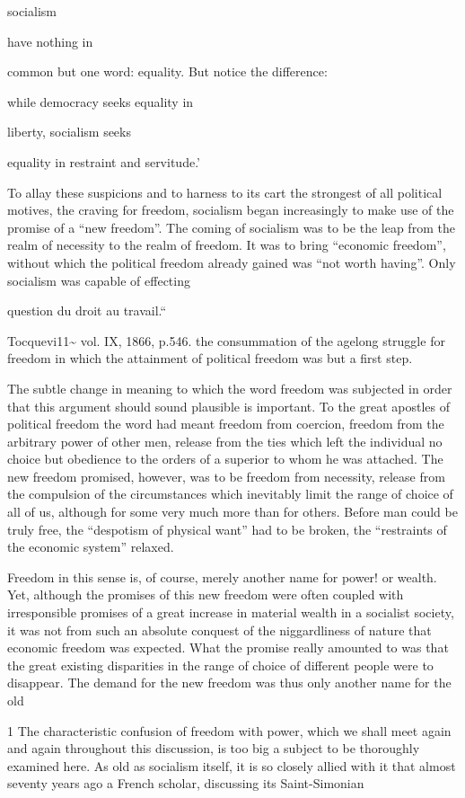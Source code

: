 \documentclass[11pt,openany]{book}
\begin{document}
socialism

have nothing in

common but one word: equality. But notice the difference:

while democracy seeks equality in

liberty, socialism seeks

equality in restraint and servitude.'

To allay these suspicions and to harness to its cart the strongest of all political motives, the craving for freedom, socialism began increasingly to make use of the promise of a ``new freedom''. The coming of socialism was to be the leap from the realm of necessity to the realm of freedom. It was to bring ``economic freedom'', without which the political freedom already gained was ``not worth having''. Only socialism was capable of effecting

question du droit au travail.``

Tocquevi11\textasciitilde{} vol. IX, 1866, p.546. the consummation of the agelong struggle for freedom in which the attainment of political freedom was but a first step.

The subtle change in meaning to which the word freedom was subjected in order that this argument should sound plausible is important. To the great apostles of political freedom the word had meant freedom from coercion, freedom from the arbitrary power of other men, release from the ties which left the individual no choice but obedience to the orders of a superior to whom he was attached. The new freedom promised, however, was to be freedom from necessity, release from the compulsion of the circumstances which inevitably limit the range of choice of all of us, although for some very much more than for others. Before man could be truly free, the ``despotism of physical want'' had to be broken, the ``restraints of the economic system'' relaxed.

Freedom in this sense is, of course, merely another name for power! or wealth. Yet, although the promises of this new freedom were often coupled with irresponsible promises of a great increase in material wealth in a socialist society, it was not from such an absolute conquest of the niggardliness of nature that economic freedom was expected. What the promise really amounted to was that the great existing disparities in the range of choice of different people were to disappear. The demand for the new freedom was thus only another name for the old

1 The characteristic confusion of freedom with power, which we shall meet again and again throughout this discussion, is too big a subject to be thoroughly examined here. As old as socialism itself, it is so closely allied with it that almost seventy years ago a French scholar, discussing its Saint-Simonian
\end{document}
